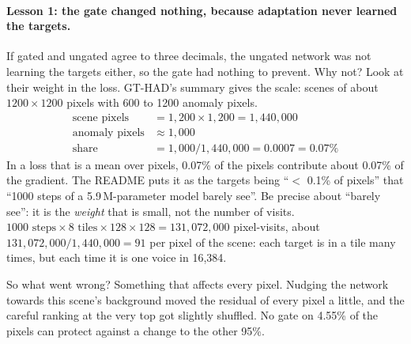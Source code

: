 \paragraph{Lesson 1: the gate changed nothing, because adaptation never learned the targets.}
If gated and ungated agree to three decimals, the ungated network was not learning the targets either, so the gate had
nothing to prevent. Why not? Look at their weight in the loss. GT-HAD's summary gives the scale: scenes of about $1200
\times 1200$ pixels with 600 to 1200 anomaly pixels.
\begin{align*}
\text{scene pixels} &= 1{,}200 \times 1{,}200 = 1{,}440{,}000\\
\text{anomaly pixels} &\approx 1{,}000\\
\text{share} &= 1{,}000 / 1{,}440{,}000 = 0.0007 = 0.07\%
\end{align*}
In a loss that is a mean over pixels, 0.07\% of the pixels contribute about 0.07\% of the gradient. The README puts it as
the targets being ``$<$ 0.1\% of pixels'' that ``1000 steps of a 5.9\,M-parameter model barely see''. Be precise about
``barely see'': it is the \emph{weight} that is small, not the number of visits. $1000 \text{ steps} \times 8 \text{ tiles}
\times 128 \times 128 = 131{,}072{,}000$ pixel-visits, about $131{,}072{,}000 / 1{,}440{,}000 = 91$ per pixel of the scene:
each target is in a tile many times, but each time it is one voice in 16,384.

So what went wrong? Something that affects every pixel. Nudging the network towards this scene's background moved the
residual of every pixel a little, and the careful ranking at the very top got slightly shuffled. No gate on 4.55\% of the
pixels can protect against a change to the other 95\%.

